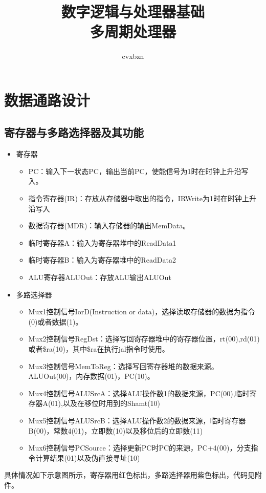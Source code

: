 \documentclass{article}
\title{数字逻辑与处理器基础\\多周期处理器}
\author{cvxbzn}
\begin{document}
\maketitle
\tableofcontents
\newpage
\section{数据通路设计}
\subsection{寄存器与多路选择器及其功能}
\begin{itemize}
    \item 寄存器
          \begin{itemize}
              \item PC：输入下一状态PC，输出当前PC，使能信号为1时在时钟上升沿写入。
              \item 指令寄存器(IR)：存放从存储器中取出的指令，IRWrite为1时在时钟上升沿写入
              \item 数据寄存器(MDR)：输入存储器的输出MemData。
              \item 临时寄存器A：输入为寄存器堆中的ReadData1
              \item 临时寄存器B：输入为寄存器堆中的ReadData2
              \item ALU寄存器ALUOut：存放ALU输出ALUOut
          \end{itemize}
    \item 多路选择器
          \begin{itemize}
              \item Mux1控制信号IorD(Instruction or data)，选择读取存储器的数据为指令(0)或者数据(1)。
              \item Mux2控制信号RegDst：选择写回寄存器堆中的寄存器位置，rt(00),rd(01)或者\$ra(10)，其中\$ra在执行jal指令时使用。
              \item Mux3控制信号MemToReg：选择写回寄存器堆的数据来源。ALUOut(00)，内存数据(01)，PC(10)。
              \item Mux4控制信号ALUSrcA：选择ALU操作数1的数据来源，PC(00),临时寄存器A(01),以及在移位时用到的Shamt(10)
              \item Mux5控制信号ALUSrcB：选择ALU操作数2的数据来源，临时寄存器B(00)，常数4(01)，立即数(10)以及移位后的立即数(11)
              \item Mux6控制信号PCSource：选择更新PC时PC的来源，PC+4(00)，分支指令计算结果(01)以及伪直接寻址(10)
          \end{itemize}
\end{itemize}
具体情况如下示意图所示，寄存器用红色标出，多路选择器用紫色标出，代码见附件。
\end{document}
